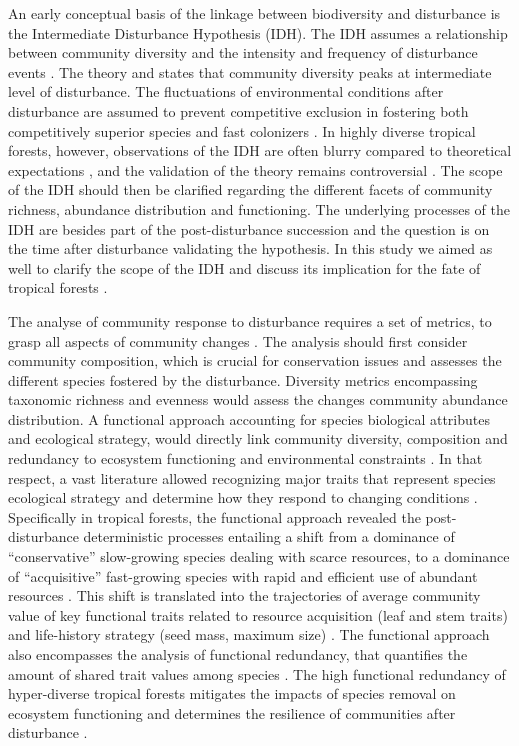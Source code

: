 \documentclass[fleqn,10pt]{ArtEcoFoG} %
\begin{document}
An early conceptual basis of the linkage between biodiversity and
disturbance is the Intermediate Disturbance Hypothesis (IDH). The IDH
assumes a relationship between community diversity and the intensity and
frequency of disturbance events \citep{Connell1978}. The theory and
states that community diversity peaks at intermediate level of
disturbance. The fluctuations of environmental conditions after
disturbance are assumed to prevent competitive exclusion in fostering
both competitively superior species and fast colonizers
\citep{Shea2004, Pulsford2016}. In highly diverse tropical forests,
however, observations of the IDH are often blurry compared to
theoretical expectations \citep{Hugues2007, Sheil2003, Norden2017}, and
the validation of the theory remains controversial
\citep{Hubbell2001, Fox2013, Sheil2013}. The scope of the IDH should
then be clarified regarding the different facets of community richness,
abundance distribution and functioning. The underlying processes of the
IDH are besides part of the post-disturbance succession and the question
is on the time after disturbance validating the hypothesis. In this
study we aimed as well to clarify the scope of the IDH and discuss its
implication for the fate of tropical forests
\citep{Sheil2003, Shea2004}.

The analyse of community response to disturbance requires a set of
metrics, to grasp all aspects of community changes
\citep{Sheil2003, Shea2004, Mayfield2010}. The analysis should first
consider community composition, which is crucial for conservation issues
\citep{Lavorel2002, Bellwood2006} and assesses the different species
fostered by the disturbance. Diversity metrics encompassing taxonomic
richness and evenness would assess the changes community abundance
distribution. A functional approach accounting for species biological
attributes and ecological strategy, would directly link community
diversity, composition and redundancy to ecosystem functioning and
environmental constraints \citep{Violle2007b, Baraloto2012a}. In that
respect, a vast literature allowed recognizing major traits that
represent species ecological strategy and determine how they respond to
changing conditions \citep{Diaz2005}. Specifically in tropical forests,
the functional approach revealed the post-disturbance deterministic
processes entailing a shift from a dominance of ``conservative''
slow-growing species dealing with scarce resources, to a dominance of
``acquisitive'' fast-growing species with rapid and efficient use of
abundant resources \citep{Rees2001, Reich2014, Herault2011}. This shift
is translated into the trajectories of average community value of key
functional traits related to resource acquisition (leaf and stem traits)
and life-history strategy (seed mass, maximum size)
\citep{Wright2004, TerSteege2006, Westoby2006a, Chave2009b}. The
functional approach also encompasses the analysis of functional
redundancy, that quantifies the amount of shared trait values among
species \citep{Carmona2016}. The high functional redundancy of
hyper-diverse tropical forests \citep{Bellwood2006} mitigates the
impacts of species removal on ecosystem functioning and determines the
resilience of communities after disturbance
\citep{Elmqvist2003, Diaz2005}.
\end{document}
